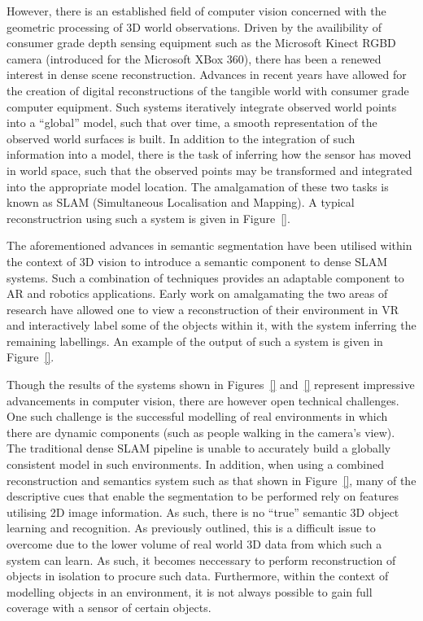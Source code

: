 However, there is an established field of computer vision concerned with the geometric processing 
of 3D world observations. Driven by the availibility of consumer grade depth sensing equipment such 
as the Microsoft Kinect RGBD camera (introduced for the Microsoft XBox 360), there has been a renewed 
interest in dense scene reconstruction. Advances in recent years have allowed for the creation of digital 
reconstructions of the tangible world with consumer grade computer equipment. Such systems iteratively 
integrate observed world points into a ``global'' model, such that over time, a smooth representation 
of the observed world surfaces is built. In addition to the integration of such information into a model, 
there is the task of inferring how the sensor has moved in world space, such that the observed points may 
be transformed and integrated into the appropriate model location. The amalgamation of these two tasks is 
known as SLAM (Simultaneous Localisation and Mapping). A typical reconstructrion using such a system is 
given in Figure~\ref{}.

The aforementioned advances in semantic segmentation have been utilised within the context of 3D vision to 
introduce a semantic component to dense SLAM systems. Such a combination of techniques provides an adaptable 
component to AR and robotics applications. Early work on amalgamating the two areas of research have allowed 
one to view a reconstruction of their environment in VR and interactively label some of the objects within 
it, with the system inferring the remaining labellings. An example of the output of such a system is given 
in Figure~\ref{}.

Though the results of the systems shown in Figures~\ref{} and~\ref{} represent impressive advancements in 
computer vision, there are however open technical challenges. One such challenge is the successful modelling 
of real environments in which there are dynamic components (such as people walking in the camera's view). 
The traditional dense SLAM pipeline is unable to accurately build a globally consistent model in such 
environments. In addition, when using a combined reconstruction and semantics system such as that shown 
in Figure~\ref{}, many of the descriptive cues that enable the segmentation to be performed rely on 
features utilising 2D image information. As such, there is no ``true'' semantic 3D object learning and 
recognition. As previously outlined, this is a difficult issue to overcome due to the lower volume of real 
world 3D data from which such a system can learn. As such, it becomes neccessary to perform reconstruction 
of objects in isolation to procure such data. Furthermore, within the context of modelling objects in an 
environment, it is not always possible to gain full coverage with a sensor of certain objects.

